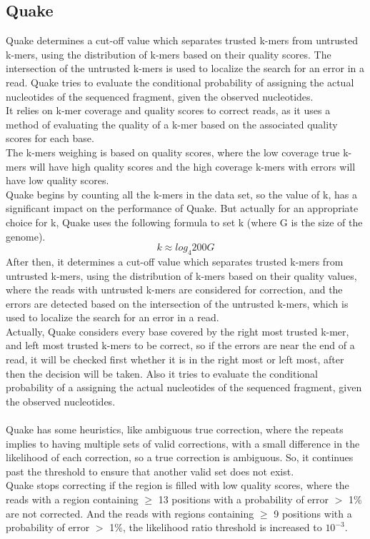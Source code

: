 \documentclass[12pt]{llncs}
\begin{document}
\subsection{Quake}
Quake \cite{Quake} determines a cut-off value which separates trusted k-mers from untrusted k-mers, using the distribution of k-mers based on their quality scores. The intersection of the untrusted k-mers is used to localize the search for an error in a read. Quake tries to evaluate the conditional probability of assigning the actual nucleotides of the sequenced fragment, given the observed nucleotides.
\\
It relies on k-mer coverage and quality scores to correct reads, as it uses a method of evaluating the quality of a k-mer based on the associated quality scores for each base. 
\\
The k-mers weighing is based on quality scores, where the low coverage true k-mers will have high quality scores and the high coverage k-mers with errors will have low quality scores.
\\
Quake begins by counting all the k-mers in the data set, so the value of k, has a significant impact on the performance of Quake. But actually for an appropriate choice for k, Quake uses the following formula to set k (where G is the size of the genome).
\[ k \approx log_{4} 200G \]  
After then, it determines a cut-off value which separates trusted k-mers from untrusted k-mers, using the distribution of k-mers based on their quality values, where the reads with untrusted k-mers are considered for correction, and the errors are detected based on the intersection of the untrusted k-mers, which is used to localize the search for an error in a read. 
\\
Actually, Quake considers every base covered by the right most trusted k-mer, and left most trusted k-mers to be correct, so if the errors are near the end of a read, it will be checked first whether it is in the right most or left most, after then the decision will be taken. Also it tries to evaluate the conditional probability of a assigning the actual nucleotides of the sequenced fragment, given the observed nucleotides.
\\
\\
Quake has some heuristics, like ambiguous true correction, where the repeats implies to having multiple sets of valid corrections, with a small difference in the likelihood of each correction, so a true correction is ambiguous. So, it continues past the threshold to ensure that another valid set does not exist. 
\\
Quake stops correcting if the region is filled with low quality scores, where the reads with a region containing $\geq$ 13 positions with a probability of error $>$ 1\% are not corrected. And the reads with regions containing $\geq$ 9 positions with a probability of error $>$ 1\%, the likelihood ratio threshold is increased to $10^{-3}$.
\end{document}
